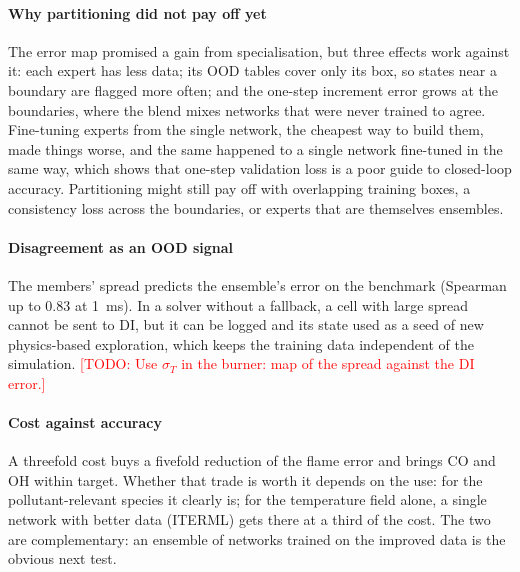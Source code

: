 \documentclass[preprint,review,12pt]{elsarticle}
\newcommand{\todo}[1]{\textcolor{red}{[TODO: #1]}}
\begin{document}
\paragraph{Why partitioning did not pay off yet}
The error map promised a gain from specialisation, but three effects work against it: each expert has
less data; its OOD tables cover only its box, so states near a boundary are flagged more often; and the
one-step increment error grows at the boundaries, where the blend mixes networks that were never trained
to agree. Fine-tuning experts from the single network, the cheapest way to build them, made things worse,
and the same happened to a single network fine-tuned in the same way, which shows that one-step
validation loss is a poor guide to closed-loop accuracy. Partitioning might still pay off with overlapping
training boxes, a consistency loss across the boundaries, or experts that are themselves ensembles.

\paragraph{Disagreement as an OOD signal}
The members' spread predicts the ensemble's error on the benchmark (Spearman up to 0.83 at 1~ms). In a
solver without a fallback, a cell with large spread cannot be sent to DI, but it can be logged and its
state used as a seed of new physics-based exploration, which keeps the training data independent of the
simulation. \todo{Use $\sigma_T$ in the burner: map of the spread against the DI error.}

\paragraph{Cost against accuracy}
A threefold cost buys a fivefold reduction of the flame error and brings CO and OH within target. Whether
that trade is worth it depends on the use: for the pollutant-relevant species it clearly is; for the
temperature field alone, a single network with better data (ITERML) gets there at a third of the cost.
The two are complementary: an ensemble of networks trained on the improved data is the obvious next
test.
\end{document}
